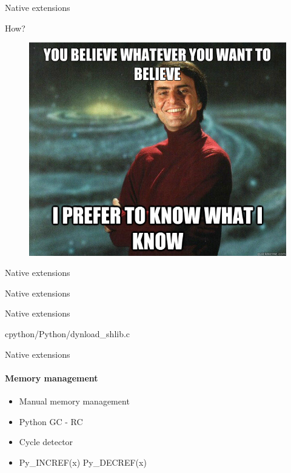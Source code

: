 \documentclass{beamer}
\begin{document}
\begin{frame}{Native extensions}
\begin{block}{}
  \lstnewtonout
\end{block}
\end{frame}

\begin{frame}{How?}
    \begin{figure}
      \includegraphics[width=0.7\linewidth]{sagan.jpg}
    \end{figure}
\end{frame}


\begin{frame}{Native extensions}
\begin{block}{}
  \lstman
\end{block}
\end{frame}

\begin{frame}{Native extensions}
\begin{block}{}
  \lstsymbols
\end{block}
\end{frame}

\begin{frame}{Native extensions}
\begin{block}{cpython/Python/dynload\_shlib.c}
  \lstdlopen
\end{block}
\end{frame}

\begin{frame}{Native extensions}
  \framesubtitle{Memory management}
  \begin{itemize}
  \item Manual memory management
  \item Python GC - RC
  \item Cycle detector
  \item Py\_INCREF(x) Py\_DECREF(x)
  \end{itemize}
\end{frame}
\end{document}
